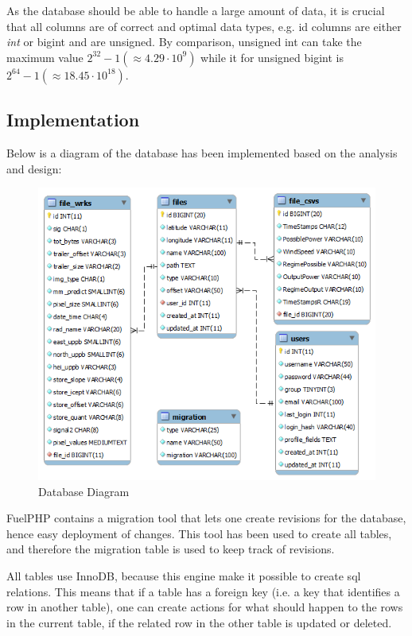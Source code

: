 As the database should be able to handle a large amount of data, it is crucial that all columns are of correct and optimal data types, e.g. \textsf{id} columns are either \textit{int} or \textsf{bigint} and are \textsf{unsigned}. By comparison, \textsf{unsigned int} can take the maximum value $2^{32}-1 (\approx 4.29 \cdot 10^{9})$ while it for \textsf{unsigned bigint} is $ 2^{64}-1 (\approx 18.45 \cdot 10^{18})$.

\subsection{Implementation}

Below is a diagram of the database has been implemented based on the analysis and design:\\
\begin{figure}[htbp]
   \centering
   \includegraphics[width=1\linewidth]{figure/db}
   \caption{Database Diagram}
\end{figure}
FuelPHP contains a \textsf{migration} tool that lets one create revisions for the database, hence easy deployment of changes. This tool has been used to create all tables, and therefore the \textsf{migration} table is used to keep track of revisions.

All tables use \textsf{InnoDB}, because this engine make it possible to create sql relations. This means that if a table has a foreign key (i.e. a key that identifies a row in another table), one can create actions for what should happen to the rows in the current table, if the related row in the other table is \textsf{updated} or \textsf{deleted}.

